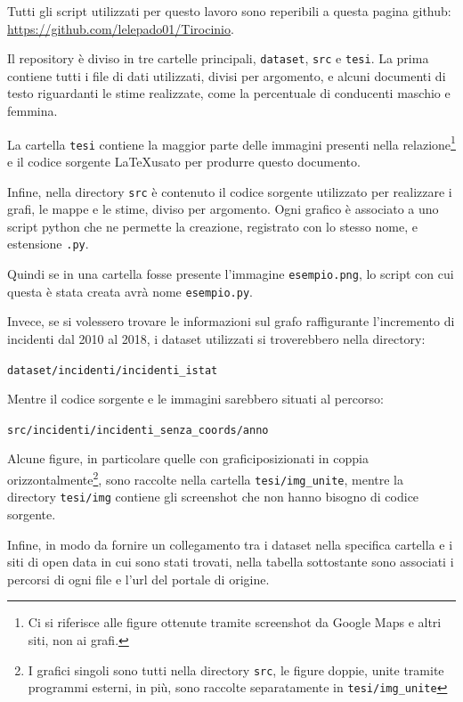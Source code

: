 \documentclass[a4paper,12pt]{report}
\newcommand{\columnstyle}[1]{\texttt{#1}}
\newcommand{\filenamestyle}[1]{\texttt{#1}}
\newcommand{\skipline}{\vspace{0.2in}}
\begin{document}
Tutti gli script utilizzati per questo lavoro sono reperibili a questa pagina 
github: \url{https://github.com/lelepado01/Tirocinio}. 

Il repository è diviso in tre cartelle principali, \filenamestyle{dataset}, \filenamestyle{src} 
e \filenamestyle{tesi}. La prima contiene tutti i file di dati utilizzati, divisi per 
argomento, e alcuni documenti di testo riguardanti le stime realizzate, come la percentuale di 
conducenti maschio e femmina. 

La cartella \columnstyle{tesi}
 contiene la maggior parte delle immagini presenti 
nella relazione\footnote{Ci si riferisce alle figure ottenute tramite screenshot 
da Google Maps e altri siti, non ai grafi.} 
e il codice sorgente \LaTeX usato per produrre questo documento.

Infine, nella directory \filenamestyle{src} è contenuto il codice sorgente utilizzato 
per realizzare i grafi, le mappe e le stime, diviso per argomento. 
Ogni grafico è associato a uno script python che ne permette la creazione, registrato con 
lo stesso nome, e estensione \filenamestyle{.py}. 

Quindi se in una cartella fosse presente l'immagine \filenamestyle{esempio.png}, lo script con 
cui questa è stata creata avrà nome \filenamestyle{esempio.py}. 

Invece, se si volessero trovare le informazioni sul grafo raffigurante 
l'incremento di incidenti 
dal 2010 al 2018, i dataset utilizzati si troverebbero nella directory:

\skipline
\indent\filenamestyle{dataset/incidenti/incidenti\_istat}

\skipline
\noindent Mentre il codice sorgente e le immagini sarebbero situati al percorso:

\skipline
\indent\filenamestyle{src/incidenti/incidenti\_senza\_coords/anno}

\skipline
Alcune figure, in particolare quelle con graficiposizionati in coppia 
orizzontalmente\footnote{I grafici singoli sono tutti nella directory \filenamestyle{src}, 
le figure doppie, unite tramite programmi esterni, in più, sono raccolte separatamente 
in \filenamestyle{tesi/img\_unite}}, 
sono raccolte nella cartella \filenamestyle{tesi/img\_unite}, 
mentre la directory \filenamestyle{tesi/img} contiene gli screenshot 
che non hanno bisogno di codice sorgente. 

Infine, in modo da fornire un collegamento tra i dataset nella specifica cartella e i siti 
di open data in cui sono stati trovati, nella tabella sottostante sono associati i percorsi di 
ogni file e l'url del portale di origine. 
\end{document}
